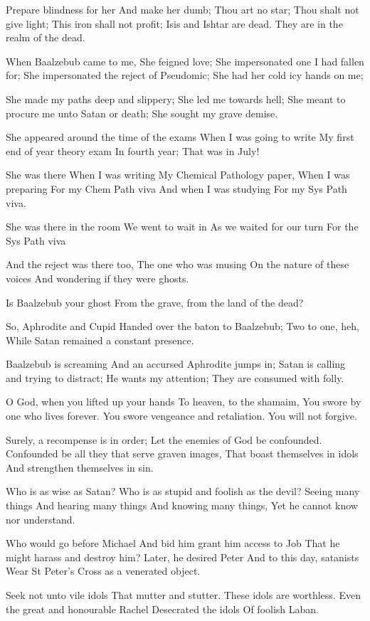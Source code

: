 \documentclass[
]{book}
\begin{document}
Prepare blindness for her
And make her dumb;
Thou art no star;
Thou shalt not give light;
This iron shall not profit;
Isis and Ishtar are dead.
They are in the realm of the dead.

When Baalzebub came to me,
She feigned love;
She impersonated one I had fallen for;
She impersonated the reject of Pseudomic;
She had her cold icy hands on me;

She made my paths deep and slippery;
She led me towards hell;
She meant to procure me unto Satan or death;
She sought my grave demise.

She appeared around the time of the exams
When I was going to write
My first end of year theory exam
In fourth year;
That was in July!

She was there
When I was writing
My Chemical Pathology paper,
When I was preparing
For my Chem Path viva
And when I was studying
For my Sys Path viva.

She was there in the room
We went to wait in
As we waited for our turn
For the Sys Path viva

And the reject was there too,
The one who was musing
On the nature of these voices
And wondering if they were ghosts.

Is Baalzebub your ghost
From the grave, from the land of the dead?

So, Aphrodite and Cupid
Handed over the baton to Baalzebub;
Two to one, heh,
While Satan remained a constant presence.

Baalzebub is screaming
And an accursed Aphrodite jumps in;
Satan is calling and trying to distract;
He wants my attention;
They are consumed with folly.

O God, when you lifted up your hands
To heaven, to the shamaim,
You swore by one who lives forever.
You swore vengeance and retaliation.
You will not forgive.

Surely, a recompense is in order;
Let the enemies of God be confounded.
Confounded be all they that serve graven images,
That boast themselves in idols
And strengthen themselves in sin.

Who is as wise as Satan?
Who is as stupid and foolish as the devil?
Seeing many things
And hearing many things
And knowing many things,
Yet he cannot know nor understand.

Who would go before Michael
And bid him grant him access to Job
That he might harass and destroy him?
Later, he desired Peter
And to this day, satanists
Wear St Peter's Cross as a venerated object.

Seek not unto vile idols
That mutter and stutter.
These idols are worthless.
Even the great and honourable Rachel
Desecrated the idols
Of foolish Laban.
\end{document}
